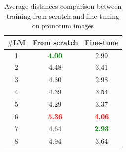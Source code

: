 \documentclass[review]{elsarticle}
\begin{document}
\begin{table}[htbp]
	\centering
	\begin{tabular}{|c|c|c|}
		\hline
		\textbf{$\#$LM} & \textbf{From scratch} & \textbf{Fine-tune} \\ \hline
		1 & \textcolor{green}{\textbf{4.00 }}& 2.99\\ \hline
		2 & 4.48 & 3.41  \\ \hline
		3 & 4.30  & 2.98 \\ \hline
		4 & 4.39  & 3.54\\ \hline
		5 & 4.29  & 3.37 \\ \hline
		6 & \textcolor{red}{\textbf{5.36}}  & \textcolor{red}{\textbf{4.06}} \\ \hline
		7 & 4.64  & \textcolor{green}{\textbf{2.93}} \\ \hline
		8 & 4.94  & 3.64 \\ \hline
	\end{tabular}
	\caption{Average distances comparison between training from scratch and fine-tuning on pronotum images}
	\label{cmppronotum}
\end{table}
\end{document}
